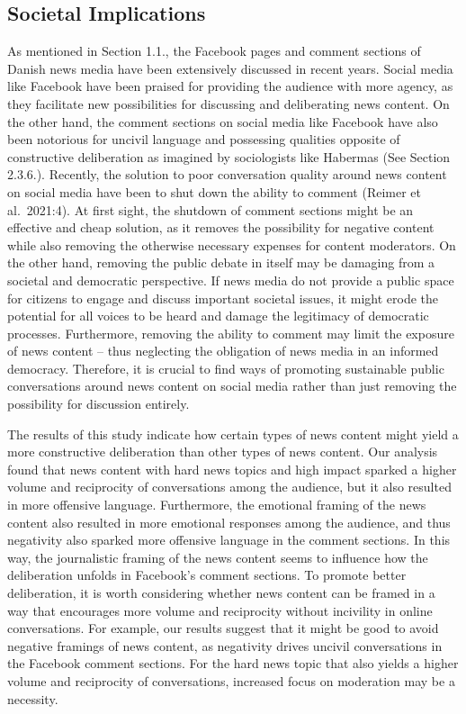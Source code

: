 \documentclass[
]{article}
\begin{document}
\hypertarget{societal-implications}{%
\subsection{Societal Implications}\label{societal-implications}}

As mentioned in Section 1.1., the Facebook pages and comment sections of
Danish news media have been extensively discussed in recent years.
Social media like Facebook have been praised for providing the audience
with more agency, as they facilitate new possibilities for discussing
and deliberating news content. On the other hand, the comment sections
on social media like Facebook have also been notorious for uncivil
language and possessing qualities opposite of constructive deliberation
as imagined by sociologists like Habermas (See Section 2.3.6.).
Recently, the solution to poor conversation quality around news content
on social media have been to shut down the ability to comment (Reimer et
al.~2021:4). At first sight, the shutdown of comment sections might be
an effective and cheap solution, as it removes the possibility for
negative content while also removing the otherwise necessary expenses
for content moderators. On the other hand, removing the public debate in
itself may be damaging from a societal and democratic perspective. If
news media do not provide a public space for citizens to engage and
discuss important societal issues, it might erode the potential for all
voices to be heard and damage the legitimacy of democratic processes.
Furthermore, removing the ability to comment may limit the exposure of
news content -- thus neglecting the obligation of news media in an
informed democracy. Therefore, it is crucial to find ways of promoting
sustainable public conversations around news content on social media
rather than just removing the possibility for discussion entirely.

The results of this study indicate how certain types of news content
might yield a more constructive deliberation than other types of news
content. Our analysis found that news content with hard news topics and
high impact sparked a higher volume and reciprocity of conversations
among the audience, but it also resulted in more offensive language.
Furthermore, the emotional framing of the news content also resulted in
more emotional responses among the audience, and thus negativity also
sparked more offensive language in the comment sections. In this way,
the journalistic framing of the news content seems to influence how the
deliberation unfolds in Facebook's comment sections. To promote better
deliberation, it is worth considering whether news content can be framed
in a way that encourages more volume and reciprocity without incivility
in online conversations. For example, our results suggest that it might
be good to avoid negative framings of news content, as negativity drives
uncivil conversations in the Facebook comment sections. For the hard
news topic that also yields a higher volume and reciprocity of
conversations, increased focus on moderation may be a necessity.
\end{document}
